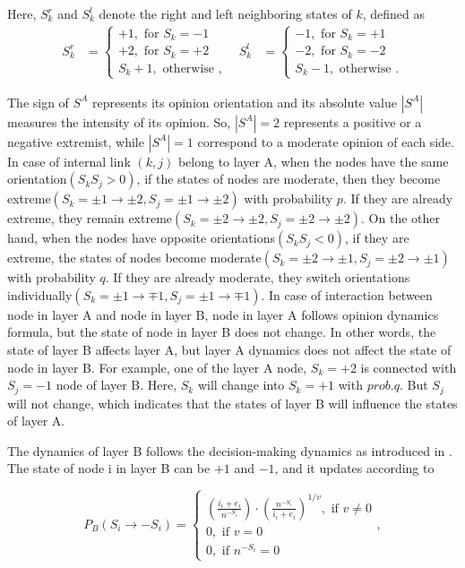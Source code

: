 Here, $S_k^r$ and $S_k^l$ denote the right and left neighboring states of $k$, defined as
\begin{align}
S_k^r &= \left\{\begin{matrix}
+1,\mbox{ for } S_k = -1\\
+2,\mbox{ for } S_k = +2\\ 
S_k + 1,\mbox{ otherwise }, 
\end{matrix}\right. &
S_k^l &= \left\{\begin{matrix}
-1,\mbox{ for } S_k= +1
\\ -2,\mbox{ for } S_k=-2
\\ S_k - 1,\mbox{ otherwise }.
\end{matrix}\right.
\end{align}

The sign of $S^A$ represents its opinion orientation and its absolute value $|S^A|$ measures the intensity of its opinion. So, $|S^A|=2$ represents a positive or a negative extremist, while  $|S^A|=1$ correspond to a moderate opinion of each side. In case of internal link $(k, j)$ belong to layer A, when the nodes have the same orientation$(S_kS_j>0)$, if the states of nodes are moderate, then they become extreme$(S_k=\pm1 \rightarrow \pm2, S_j= \pm1 \rightarrow \pm2)$ with probability $p$. If they are already extreme, they remain extreme$(S_k=\pm2 \rightarrow \pm2, S_j= \pm2 \rightarrow \pm2)$. On the other hand, when the nodes have opposite orientations$(S_kS_j<0)$, if they are extreme, the states of nodes become moderate$(S_k=\pm2 \rightarrow \pm1, S_j= \pm2 \rightarrow \pm1)$ with probability $q$. If they are already moderate, they switch orientations individually$(S_k=\pm1 \rightarrow \mp1, S_j= \pm1 \rightarrow \mp1)$.  In case of interaction between node in layer A and node in layer B, node in layer A follows opinion dynamics formula, but the state of node in layer B does not change. In other words, the state of layer B affects layer A, but layer A dynamics does not affect the state of node in layer B. For example, one of the layer A node, $S_k = +2$ is connected with  $S_j = -1$ node of layer B. Here, $S_k$ will change into $S_k = +1$ with $prob.q$. But $S_j$ will not change, which indicates that the states of layer B will influence the states of layer A.

The dynamics of layer B follows the decision-making dynamics as introduced in \parencite{abrams2003, vazquez2010}. The state of node i in layer B can be $+1$ and $-1$, and it updates according to

\begin{equation}
{P_B}({S_i} \to  - {S_i}) = \begin{cases}
{\left({\displaystyle\frac{{{i_i} + {e_i}}}{{{n^{ - {S_i}}}}}}\right)}{\cdot}{\left({\displaystyle\frac{{n^{-{S_i}}}}{{{i_i} + {e_i}}}} \right)^{1/v}}  ,\mbox{ if } v \ne 0\\
0,\mbox{ if } v = 0\\
0,\mbox{ if } {n^{ - {S_i}}} = 0
\end{cases},
\end{equation}

